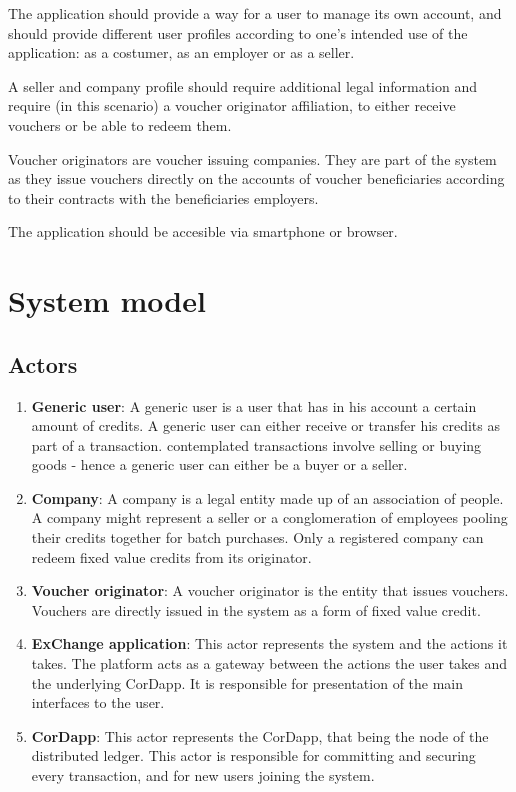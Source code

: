 The application should provide a way for a user to manage its own account, and should provide different user profiles according to one's intended use of the application: as a costumer, as an employer or as a seller.

A seller and company profile should require additional legal information and require (in this scenario) a voucher originator affiliation, to either receive vouchers or be able to redeem them.

Voucher originators are voucher issuing companies. They are part of the system as they issue vouchers directly on the accounts of voucher beneficiaries according to their contracts with the beneficiaries employers.

The application should be accesible via smartphone or browser.

\section{System model}

\subsection{Actors}
\begin{enumerate}
    \item \textbf{Generic user}: A generic user is a user that has in his account a certain amount of credits. A generic user can either receive or transfer his credits as part of a transaction. contemplated transactions involve selling or buying goods - hence a generic user can either be a buyer or a seller.
    \item \textbf{Company}: A company is a legal entity made up of an association of people. A company might represent a seller or a conglomeration of employees pooling their credits together for batch purchases. Only a registered company can redeem fixed value credits from its originator.
    \item \textbf{Voucher originator}: A voucher originator is the entity that issues vouchers. Vouchers are directly issued in the system as a form of fixed value credit.
    \item \textbf{ExChange application}: This actor represents the system and the actions it takes. The platform acts as a gateway between the actions the user takes and the underlying CorDapp. It is responsible for presentation of the main interfaces to the user.
    \item \textbf{CorDapp}: This actor represents the CorDapp, that being the node of the distributed ledger. This actor is responsible for committing and securing every transaction, and for new users joining the system.
\end{enumerate}

